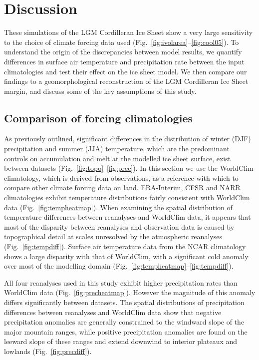 \section{Discussion}
\label{sec:discussion}

These simulations of the LGM Cordilleran Ice Sheet show a very large sensitivity to the choice of climate forcing data used (Fig.~\ref{fig:ivolarea}--\ref{fig:cool05}). To understand the origin of the discrepancies between model results, we quantify differences in surface air temperature and precipitation rate between the input climatologies and test their effect on the ice sheet model. We then compare our findings to a geomorphological reconstruction of the LGM Cordilleran Ice Sheet margin, and discuss some of the key assumptions of this study.

\subsection{Comparison of forcing climatologies}

As previously outlined, significant differences in the distribution of winter (DJF) precipitation and summer (JJA) temperature, which are the predominant controls on accumulation and melt at the modelled ice sheet surface, exist between datasets (Fig.~\ref{fig:topo}--\ref{fig:prec}). In this section we use the WorldClim climatology, which is derived from observations, as a reference with which to compare other climate forcing data on land. ERA-Interim, CFSR and NARR climatologies exhibit temperature distributions fairly consistent with WorldClim data (Fig.~\ref{fig:tempheatmap}). When examining the spatial distribution of temperature differences between reanalyses and WorldClim data, it appears that most of the disparity between reanalyses and observation data is caused by topographical detail at scales unresolved by the atmospheric reanalyses (Fig.~\ref{fig:tempdiff}). Surface air temperature data from the NCAR climatology shows a large disparity with that of WorldClim, with a significant cold anomaly over most of the modelling domain (Fig.~\ref{fig:tempheatmap}--\ref{fig:tempdiff}).

All four reanalyses used in this study exhibit higher precipitation rates than WorldClim data (Fig.~\ref{fig:precheatmap}). However the magnitude of this anomaly differs significantly between datasets. The spatial distributions of precipitation differences between reanalyses and WorldClim data show that negative precipitation anomalies are generally constrained to the windward slope of the major mountain ranges, while positive precipitation anomalies are found on the leeward slope of these ranges and extend downwind to interior plateaux and lowlands (Fig.~\ref{fig:precdiff}).

